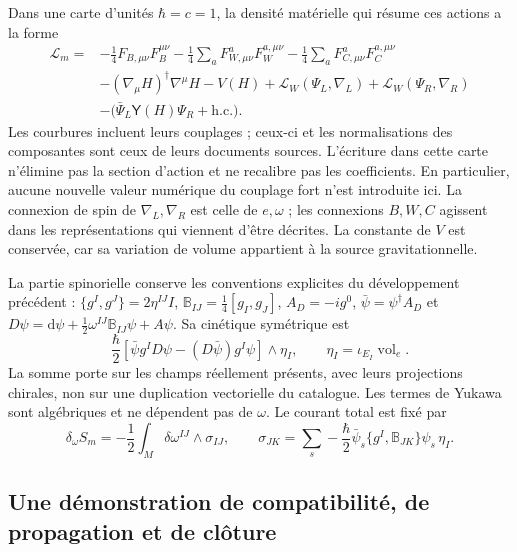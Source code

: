 Dans une carte d’unités \(\hbar=c=1\), la densité matérielle qui résume ces actions a la forme
\begin{equation}
 \begin{split}
 \mathcal L_m={}&-\frac14 F_{B,\mu\nu}F_B^{\mu\nu}
 -\frac14\sum_a F_{W,\mu\nu}^aF_W^{a,\mu\nu}
 -\frac14\sum_a F_{C,\mu\nu}^aF_C^{a,\mu\nu}\\
 &-(\nabla_\mu H)^\dagger\nabla^\mu H-V(H)
 +\mathcal L_W(\Psi_L,\nabla_L)+\mathcal L_W(\Psi_R,\nabla_R)\\
 &-\bigl(\bar\Psi_L\mathsf Y(H)\Psi_R+\mathrm{h.c.}\bigr).
 \end{split}
 \label{hmtcuatro:densidad-material}
\end{equation}
Les courbures incluent leurs couplages ; ceux-ci et les normalisations des composantes sont ceux de leurs documents sources. L’écriture dans cette carte n’élimine pas la section d’action et ne recalibre pas les coefficients. En particulier, aucune nouvelle valeur numérique du couplage fort n’est introduite ici. La connexion de spin de \(\nabla_L,\nabla_R\) est celle de \(e,\omega\) ; les connexions \(B,W,C\) agissent dans les représentations qui viennent d’être décrites. La constante de \(V\) est conservée, car sa variation de volume appartient à la source gravitationnelle.

La partie spinorielle conserve les conventions explicites du développement précédent : \(\{g^I,g^J\}=2\eta^{IJ}I\), \(\mathbb B_{IJ}=\frac14[g_I,g_J]\), \(A_D=-ig^0\), \(\bar\psi=\psi^\dagger A_D\) et \(D\psi=\mathrm d\psi+\frac12\omega^{IJ}\mathbb B_{IJ}\psi+A\psi\). Sa cinétique symétrique est
\[
 \frac{\hbar}{2}
 [\bar\psi g^I D\psi-(D\bar\psi)g^I\psi]\wedge\eta_I,
 \qquad \eta_I=\iota_{E_I}\operatorname{vol}_e .
\]
La somme porte sur les champs réellement présents, avec leurs projections chirales, non sur une duplication vectorielle du catalogue. Les termes de Yukawa sont algébriques et ne dépendent pas de \(\omega\). Le courant total est fixé par
\begin{equation}
 \delta_\omega S_m=-\frac12\int_M\delta\omega^{IJ}\wedge\sigma_{IJ},
 \qquad
 \sigma_{JK}=\sum_s-\frac{\hbar}{2}
   \bar\psi_s\{g^I,\mathbb B_{JK}\}\psi_s\,\eta_I.
 \label{hmtcuatro:corriente-total}
\end{equation}

\subsection{Une démonstration de compatibilité, de propagation et de clôture}
\label{hmtcuatro:demostracion-unica}

